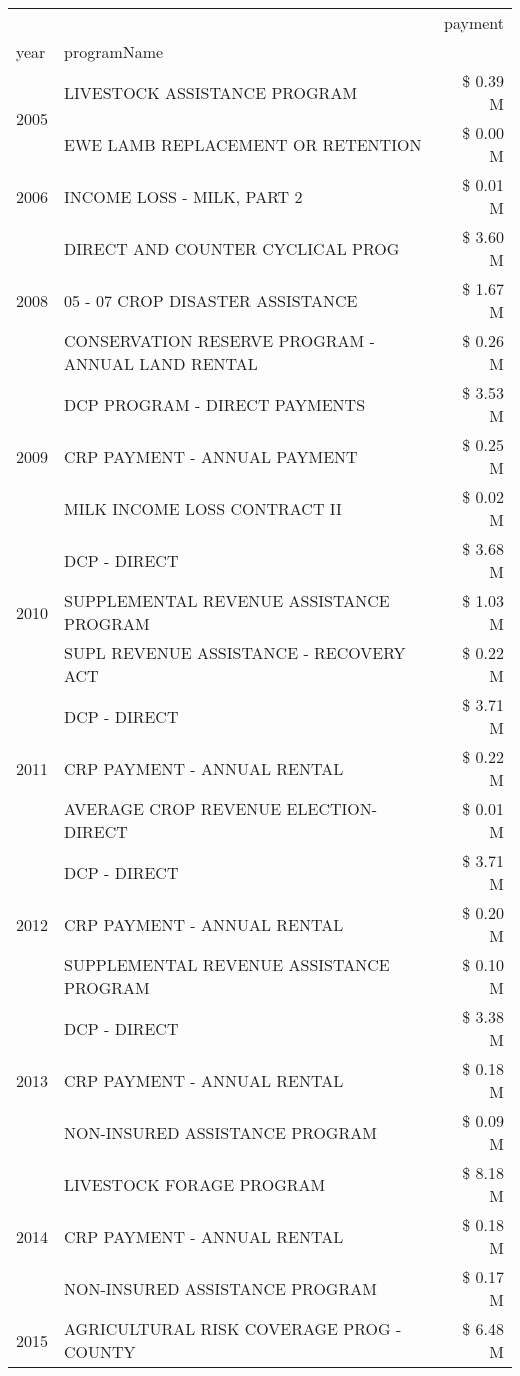 \begin{tabular}{llr}
\toprule
 &  & payment \\
year & programName &  \\
\midrule
\multirow[t]{2}{*}{2005} & LIVESTOCK ASSISTANCE PROGRAM & \$ 0.39 M \\
 & EWE LAMB REPLACEMENT OR RETENTION & \$ 0.00 M \\
\cline{1-3}
2006 & INCOME LOSS - MILK, PART 2 & \$ 0.01 M \\
\cline{1-3}
\multirow[t]{3}{*}{2008} & DIRECT AND COUNTER CYCLICAL PROG & \$ 3.60 M \\
 & 05 - 07 CROP DISASTER ASSISTANCE & \$ 1.67 M \\
 & CONSERVATION RESERVE PROGRAM - ANNUAL LAND RENTAL & \$ 0.26 M \\
\cline{1-3}
\multirow[t]{3}{*}{2009} & DCP PROGRAM - DIRECT PAYMENTS & \$ 3.53 M \\
 & CRP PAYMENT - ANNUAL PAYMENT & \$ 0.25 M \\
 & MILK INCOME LOSS CONTRACT II & \$ 0.02 M \\
\cline{1-3}
\multirow[t]{3}{*}{2010} & DCP - DIRECT & \$ 3.68 M \\
 & SUPPLEMENTAL REVENUE ASSISTANCE PROGRAM & \$ 1.03 M \\
 & SUPL REVENUE ASSISTANCE - RECOVERY ACT & \$ 0.22 M \\
\cline{1-3}
\multirow[t]{3}{*}{2011} & DCP - DIRECT & \$ 3.71 M \\
 & CRP PAYMENT - ANNUAL RENTAL & \$ 0.22 M \\
 & AVERAGE CROP REVENUE ELECTION-DIRECT & \$ 0.01 M \\
\cline{1-3}
\multirow[t]{3}{*}{2012} & DCP - DIRECT & \$ 3.71 M \\
 & CRP PAYMENT - ANNUAL RENTAL & \$ 0.20 M \\
 & SUPPLEMENTAL REVENUE ASSISTANCE PROGRAM & \$ 0.10 M \\
\cline{1-3}
\multirow[t]{3}{*}{2013} & DCP - DIRECT & \$ 3.38 M \\
 & CRP PAYMENT - ANNUAL RENTAL & \$ 0.18 M \\
 & NON-INSURED ASSISTANCE PROGRAM & \$ 0.09 M \\
\cline{1-3}
\multirow[t]{3}{*}{2014} & LIVESTOCK FORAGE PROGRAM & \$ 8.18 M \\
 & CRP PAYMENT - ANNUAL RENTAL & \$ 0.18 M \\
 & NON-INSURED ASSISTANCE PROGRAM & \$ 0.17 M \\
\cline{1-3}
\multirow[t]{3}{*}{2015} & AGRICULTURAL RISK COVERAGE PROG - COUNTY & \$ 6.48 M \\

\end{tabular}
